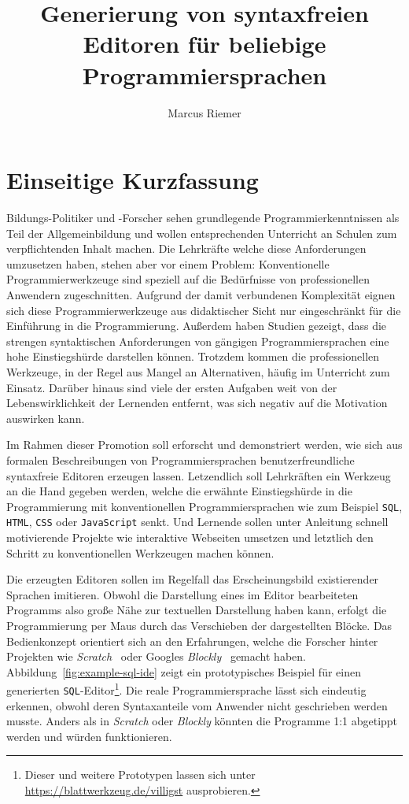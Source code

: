 \documentclass[paper=a4,fontsize=11pt,parskip=half]{scrartcl}
\title{Generierung von syntaxfreien Editoren für beliebige Programmiersprachen}
\author{Marcus Riemer}
\begin{document}
\pagestyle{empty}

\maketitle
\tableofcontents

\clearpage
{}
\section{Einseitige Kurzfassung}

Bildungs-Politiker und -Forscher sehen grundlegende Programmierkenntnissen als Teil der Allgemeinbildung und wollen entsprechenden Unterricht an Schulen zum verpflichtenden Inhalt machen\cite{noauthor_designierte_2018}. Die Lehrkräfte welche diese Anforderungen umzusetzen haben, stehen aber vor einem Problem: Konventionelle Programmierwerkzeuge sind speziell auf die Bedürfnisse von professionellen Anwendern zugeschnitten. Aufgrund der damit verbundenen Komplexität eignen sich diese Programmierwerkzeuge aus didaktischer Sicht nur eingeschränkt für die Einführung in die Programmierung. Außerdem haben Studien gezeigt, dass die strengen syntaktischen Anforderungen von gängigen Programmiersprachen eine hohe Einstiegshürde darstellen können\cite{resnick_scratch:_2009}. Trotzdem kommen die professionellen Werkzeuge, in der Regel aus Mangel an Alternativen, häufig im Unterricht zum Einsatz. Darüber hinaus sind viele der ersten Aufgaben weit von der Lebenswirklichkeit der Lernenden entfernt, was sich negativ auf die Motivation auswirken kann\cite{resnick_scratch:_2009}.

Im Rahmen dieser Promotion soll erforscht und demonstriert werden, wie sich aus formalen Beschreibungen von Programmiersprachen benutzerfreundliche syntaxfreie Editoren erzeugen lassen. Letzendlich soll Lehrkräften ein Werkzeug an die Hand gegeben werden, welche die erwähnte Einstiegshürde in die Programmierung mit konventionellen Programmiersprachen wie zum Beispiel \texttt{SQL}, \texttt{HTML}, \texttt{CSS} oder \texttt{JavaScript} senkt. Und Lernende sollen unter Anleitung schnell motivierende Projekte wie interaktive Webseiten umsetzen und letztlich den Schritt zu konventionellen Werkzeugen machen können.

Die erzeugten Editoren sollen im Regelfall das Erscheinungsbild existierender Sprachen imitieren. Obwohl die Darstellung eines im Editor bearbeiteten Programms also große Nähe zur textuellen Darstellung haben kann, erfolgt die Programmierung per Maus durch das Verschieben der dargestellten Blöcke. Das Bedienkonzept orientiert sich an den Erfahrungen, welche die Forscher hinter Projekten wie \textit{Scratch}~\cite{maloney_scratch:_2004} oder Googles \textit{Blockly}~\cite{fraser_ten_2015} gemacht haben. Abbildung~\ref{fig:example-sql-ide} zeigt ein prototypisches Beispiel für einen generierten \texttt{SQL}-Editor\footnote{Dieser und weitere Prototypen lassen sich unter \url{https://blattwerkzeug.de/villigst} ausprobieren.}. Die reale Programmiersprache lässt sich eindeutig erkennen, obwohl deren Syntaxanteile vom Anwender nicht geschrieben werden musste. Anders als in \textit{Scratch} oder \textit{Blockly} könnten die Programme 1:1 abgetippt werden und würden funktionieren.
\end{document}
